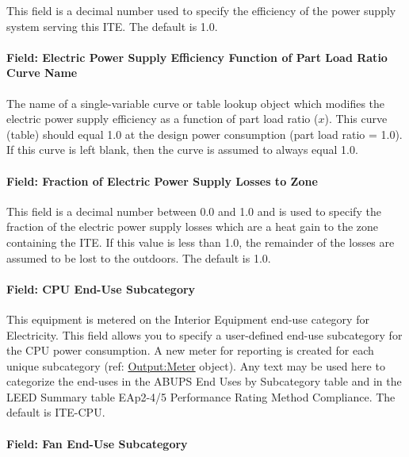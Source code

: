 This field is a decimal number used to specify the efficiency of the power supply system serving this ITE. The default is 1.0.

\paragraph{Field: Electric Power Supply Efficiency Function of Part Load Ratio Curve Name}\label{field-electric-power-supply-efficiency-function-of-part-load-ratio-curve-name}

The name of a single-variable curve or table lookup object which modifies the electric power supply efficiency as a function of part load ratio ($x$). This curve (table) should equal 1.0 at the design power consumption (part load ratio = 1.0). If this curve is left blank, then the curve is assumed to always equal 1.0.

\paragraph{Field: Fraction of Electric Power Supply Losses to Zone}\label{field-fraction-of-electric-power-supply-losses-to-zone}

This field is a decimal number between 0.0 and 1.0 and is used to specify the fraction of the electric power supply losses which are a heat gain to the zone containing the ITE. If this value is less than 1.0, the remainder of the losses are assumed to be lost to the outdoors. The default is 1.0.

\paragraph{Field: CPU End-Use Subcategory}\label{field-cpu-end-use-subcategory}

This equipment is metered on the Interior Equipment end-use category for Electricity. This field allows you to specify a user-defined end-use subcategory for the CPU power consumption. A new meter for reporting is created for each unique subcategory (ref: \hyperref[outputmeter-and-outputmetermeterfileonly]{Output:Meter} object). Any text may be used here to categorize the end-uses in the ABUPS End Uses by Subcategory table and in the LEED Summary table EAp2-4/5 Performance Rating Method Compliance. The default is ITE-CPU.

\paragraph{Field: Fan End-Use Subcategory}\label{field-fan-end-use-subcategory}

